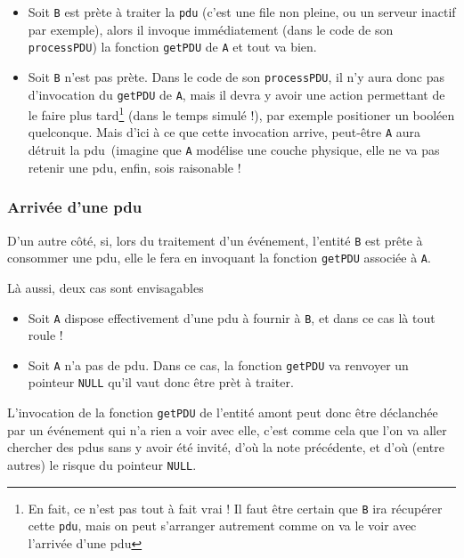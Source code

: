 \begin{itemize}
   \item Soit {\tt B} est prète à traiter la {\tt pdu} (c'est une file
     non pleine, ou un serveur inactif par exemple), alors il invoque
     immédiatement (dans le code de son \lstinline!processPDU!) la
     fonction \lstinline!getPDU! de {\tt A} et tout va bien.
   \item Soit {\tt B} n'est pas prète. Dans le code de son
     \lstinline!processPDU!, il n'y aura donc pas d'invocation du
     \lstinline!getPDU! de {\tt A}, mais il devra y avoir une action
     permettant de le faire plus tard\footnote{En fait, ce n'est pas
       tout à fait vrai ! Il faut être certain que {\tt B} ira
       récupérer cette {\tt pdu}, mais on peut s'arranger autrement
       comme on va le voir avec l'arrivée d'une {\sc pdu}} (dans le temps simulé !), par
     exemple positioner un booléen quelconque. Mais d'ici à ce que
     cette invocation arrive, peut-être {\tt A} aura détruit la {\sc
       pdu} (imagine que {\tt A} modélise une couche physique, elle ne
     va pas retenir une {\sc pdu}, enfin, sois raisonable !
\end{itemize}

%
\subsubsection{Arrivée d'une {\sc pdu}}

   D'un autre côté, si, lors du traitement d'un événement, l'entité
{\tt B} est prête à consommer une {\sc pdu}, elle le fera en invoquant
la fonction \lstinline!getPDU! associée à {\tt A}.

   Là aussi, deux cas sont envisagables

\begin{itemize}
   \item Soit {\tt A} dispose effectivement d'une {\sc pdu} à fournir
     à {\tt B}, et dans ce cas là tout roule !
   \item Soit {\tt A} n'a pas de {\sc pdu}. Dans ce cas, la fonction
     \lstinline!getPDU! va renvoyer un pointeur \lstinline!NULL! qu'il
     vaut donc être prèt à traiter.
\end{itemize}

   L'invocation de la fonction \lstinline!getPDU! de l'entité amont
peut donc être déclanchée par un événement qui n'a rien a voir avec
elle, c'est comme cela que l'on va aller chercher des {\sc pdu}s sans
y avoir été invité, d'où la note précédente, et d'où (entre autres) le
risque du pointeur \lstinline!NULL!.


